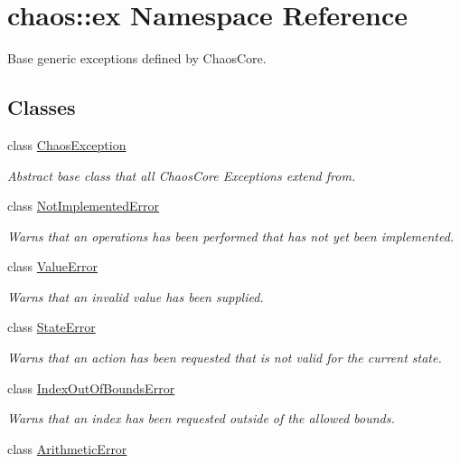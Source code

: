 \hypertarget{namespacechaos_1_1ex}{\section{chaos\-:\-:ex Namespace Reference}
\label{namespacechaos_1_1ex}
}


Base generic exceptions defined by Chaos\-Core.  


\subsection*{Classes}
\begin{DoxyCompactItemize}
\item 
class \hyperlink{classchaos_1_1ex_1_1_chaos_exception}{Chaos\-Exception}
\begin{DoxyCompactList}\small\item\em Abstract base class that all Chaos\-Core Exceptions extend from. \end{DoxyCompactList}\item 
class \hyperlink{classchaos_1_1ex_1_1_not_implemented_error}{Not\-Implemented\-Error}
\begin{DoxyCompactList}\small\item\em Warns that an operations has been performed that has not yet been implemented. \end{DoxyCompactList}\item 
class \hyperlink{classchaos_1_1ex_1_1_value_error}{Value\-Error}
\begin{DoxyCompactList}\small\item\em Warns that an invalid value has been supplied. \end{DoxyCompactList}\item 
class \hyperlink{classchaos_1_1ex_1_1_state_error}{State\-Error}
\begin{DoxyCompactList}\small\item\em Warns that an action has been requested that is not valid for the current state. \end{DoxyCompactList}\item 
class \hyperlink{classchaos_1_1ex_1_1_index_out_of_bounds_error}{Index\-Out\-Of\-Bounds\-Error}
\begin{DoxyCompactList}\small\item\em Warns that an index has been requested outside of the allowed bounds. \end{DoxyCompactList}\item 
class \hyperlink{classchaos_1_1ex_1_1_arithmetic_error}{Arithmetic\-Error}

\end{DoxyCompactItemize}
